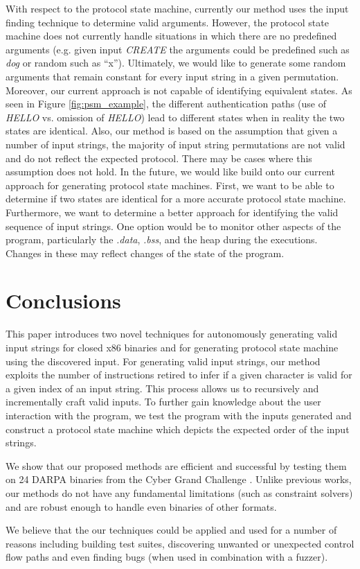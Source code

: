 \documentclass{acm_proc_article-sp}
\def \numbinaries {24}
\begin{document}
With respect to the protocol state machine, currently our method uses the input finding technique to determine valid arguments.
However, the protocol state machine does not currently handle situations in which there are no predefined arguments (e.g. given input \textit{CREATE} the arguments could be predefined such as \textit{dog} or random such as ``x'').
Ultimately, we would like to generate some random arguments that remain constant for every input string in a given permutation.
Moreover, our current approach is not capable of identifying equivalent states. As seen in Figure \ref{fig:psm_example}, the different authentication paths (use of \textit{HELLO} vs. omission of \textit{HELLO}) lead to different states when in reality the two states are identical.
Also, our method is based on the assumption that given a number of input strings, the majority of input string permutations are not valid and do not reflect the expected protocol.
There may be cases where this assumption does not hold.
In the future, we would like build onto our current approach for generating protocol state machines. 
First, we want to be able to determine if two states are identical for a more accurate protocol state machine.
Furthermore, we want to determine a better approach for identifying the valid sequence of input strings.
One option would be to monitor other aspects of the program, particularly the \textit{.data}, \textit{.bss}, and the heap during the executions.
Changes in these may reflect changes of the state of the program.


\section{Conclusions}
This paper introduces two novel techniques for autonomously generating valid input strings for closed x86 binaries and for generating protocol state machine using the discovered input.
For generating valid input strings, our method exploits the number of instructions retired to infer if a given character is valid for a given index of an input string.
This process allows us to recursively and incrementally craft valid inputs.
To further gain knowledge about the user interaction with the program, we test the program with the inputs generated and construct a protocol state machine which depicts the expected order of the input strings.

We show that our proposed methods are efficient and successful by testing them on \numbinaries{} DARPA binaries from the Cyber Grand Challenge \cite{darpacgc}. 
Unlike previous works, our methods do not have any fundamental limitations (such as constraint solvers) and are robust enough to handle even binaries of other formats.

We believe that the our techniques could be applied and used for a number of reasons including building test suites, discovering unwanted or unexpected control flow paths and even finding bugs (when used in combination with a fuzzer).




\end{document}
